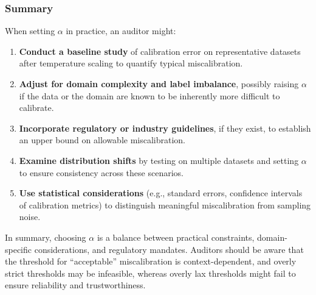 \subsubsection{Summary}

When setting $\alpha$ in practice, an auditor might:
\begin{enumerate}
    \item \textbf{Conduct a baseline study} of calibration error on representative datasets after temperature scaling to quantify typical miscalibration.
    \item \textbf{Adjust for domain complexity and label imbalance}, possibly raising $\alpha$ if the data or the domain are known to be inherently more difficult to calibrate.
    \item \textbf{Incorporate regulatory or industry guidelines}, if they exist, to establish an upper bound on allowable miscalibration.
    \item \textbf{Examine distribution shifts} by testing on multiple datasets and setting $\alpha$ to ensure consistency across these scenarios.
    \item \textbf{Use statistical considerations} (e.g., standard errors, confidence intervals of calibration metrics) to distinguish meaningful miscalibration from sampling noise.
\end{enumerate}

In summary, choosing $\alpha$ is a balance between practical constraints, domain-specific considerations, and regulatory mandates. Auditors should be aware that the threshold for ``acceptable'' miscalibration is context-dependent, and overly strict thresholds may be infeasible, whereas overly lax thresholds might fail to ensure reliability and trustworthiness.
